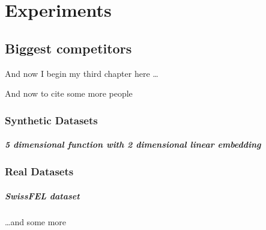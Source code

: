 \chapter{Experiments}

\ifpdf
    \graphicspath{{Chapter3/Figs/Raster/}{Chapter3/Figs/PDF/}{Chapter3/Figs/}}
\else
    \graphicspath{{Chapter3/Figs/Vector/}{Chapter3/Figs/}}
\fi

\section{Biggest competitors}
And now I begin my third chapter here \dots

And now to cite some more people~\citet{Rea85,Ancey1996}

\subsection{Synthetic Datasets}
\paragraph{5 dimensional function with 2 dimensional linear embedding}

\subsection{Real Datasets}

\paragraph{SwissFEL dataset}
\dots and some more 

